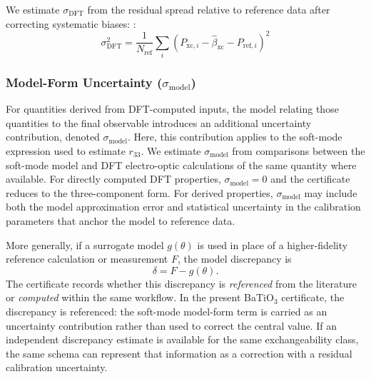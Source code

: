 \documentclass[twocolumn,superscriptaddress,amsmath,amssymb,longbibliography]{revtex4-2}
\newcommand{\xc}{\mathrm{xc}}
\begin{document}
We estimate $\sigma_{\mathrm{DFT}}$ from the residual spread relative to reference data after correcting systematic biases:
\cite{Pernot2015,Pernot2020}:
\begin{equation}
    \sigma_{\mathrm{DFT}}^2 = \frac{1}{N_{\mathrm{ref}}} \sum_i
    \left( P_{\xc,i} - \hat{\beta}_{\xc} - P_{\mathrm{ref},i} \right)^2
    \label{eq:intrinsic_dft}
\end{equation}

\subsubsection{Model-Form Uncertainty ($\sigma_{\mathrm{model}}$)}

For quantities derived from DFT-computed inputs, the model relating those quantities to the final observable introduces an additional uncertainty contribution, denoted  $\sigma_{\mathrm{model}}$. Here, this contribution applies to the soft-mode expression used to estimate $r_{33}$. We estimate $\sigma_{\mathrm{model}}$ from comparisons between the soft-mode model and
DFT electro-optic calculations of the same quantity where available.
For directly computed DFT properties, $\sigma_{\mathrm{model}} = 0$ and
the certificate reduces to the three-component form. For derived
properties, $\sigma_{\mathrm{model}}$ may include both the model
approximation error and statistical uncertainty in the calibration
parameters that anchor the model to reference data.

More generally, if a surrogate model $g(\theta)$ is used in place of a
higher-fidelity reference calculation or measurement $F$, the model
discrepancy is
\begin{equation}
    \delta = F - g(\theta).
\end{equation}
The certificate records whether this discrepancy is \emph{referenced}
from the literature or \emph{computed} within the same workflow. In the
present BaTiO$_3$ certificate, the discrepancy is referenced: the soft-mode
model-form term is carried as an uncertainty contribution rather than used
to correct the central value. If an independent discrepancy estimate is
available for the same exchangeability class, the same schema can represent
that information as a correction with a residual calibration uncertainty.
\end{document}
